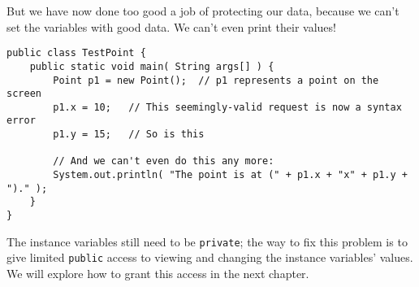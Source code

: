But we have now done too good a job of protecting our data, because we can't set the variables with good data.  We can't even print their values!

\begin{verbatim}
public class TestPoint {
    public static void main( String args[] ) {
        Point p1 = new Point();  // p1 represents a point on the screen
        p1.x = 10;   // This seemingly-valid request is now a syntax error
        p1.y = 15;   // So is this

        // And we can't even do this any more:
        System.out.println( "The point is at (" + p1.x + "x" + p1.y + ")." );
    }
}
\end{verbatim}

The instance variables still need to be \texttt{private}; the way to fix this problem is to give limited \texttt{public} access to viewing and changing the instance variables' values.  We will explore how to grant this access in the next chapter.
